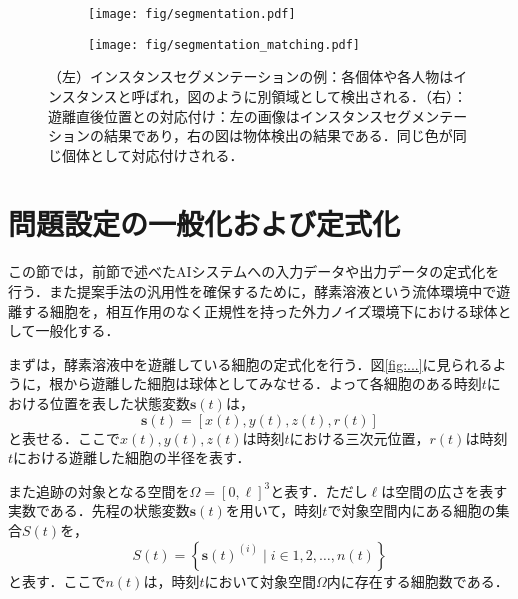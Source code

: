     \begin{figure}[t]
        \centering
        \begin{subfigure}[b]{.4\linewidth}
            \centering
            \texttt{[image: fig/segmentation.pdf]}
            \label{fig:instance_segmentation}
        \end{subfigure}
        \hfill
        \begin{subfigure}[b]{.4\linewidth}
            \centering
            \texttt{[image: fig/segmentation\_matching.pdf]}
            \label{fig:segmentation_matching}
        \end{subfigure}
        \caption[インスタンスセグメンテーションの例と遊離直後位置との対応付け]{（左）インスタンスセグメンテーションの例：各個体や各人物はインスタンスと呼ばれ，図のように別領域として検出される．（右）：遊離直後位置との対応付け：左の画像はインスタンスセグメンテーションの結果であり，右の図は物体検出の結果である．同じ色が同じ個体として対応付けされる．}
        \label{fig:instance_segmentation_and_matching}
    \end{figure}

\section{問題設定の一般化および定式化}
\label{sec:setting}

この節では，前節で述べたAIシステムへの入力データや出力データの定式化を行う．また提案手法の汎用性を確保するために，酵素溶液という流体環境中で遊離する細胞を，相互作用のなく正規性を持った外力ノイズ環境下における球体として一般化する．

まずは，酵素溶液中を遊離している細胞の定式化を行う．図\ref{fig:...}に見られるように，根から遊離した細胞は球体としてみなせる．よって各細胞のある時刻$t$における位置を表した状態変数$\bm{s}(t)$は，
\begin{equation}
    \label{eq:continous_state_vecotr}
    \bm{s}(t) = \left[x(t), y(t), z(t), r(t)\right]
\end{equation}
と表せる．ここで$x(t),y(t),z(t)$は時刻$t$における三次元位置，$r(t)$は時刻$t$における遊離した細胞の半径を表す．

また追跡の対象となる空間を$\Omega = \left[0, \ell\right]^3$と表す．ただし$\ell$は空間の広さを表す実数である．先程の状態変数$\bm{s}(t)$を用いて，時刻$t$で対象空間内にある細胞の集合$S(t)$を，
\begin{equation}
    \label{eq:set_of_cells_at_time}
    S(t) = \left\{\bm{s}(t)^{(i)} \mid i \in 1,2,\dots,n(t)\right\}
\end{equation}
と表す．ここで$n(t)$は，時刻$t$において対象空間$\Omega$内に存在する細胞数である．


